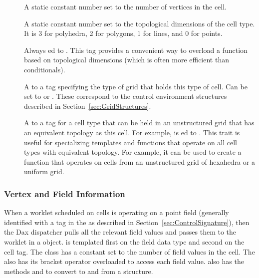 \begin{description}
\item[]  A static
  constant number set to the number of vertices in the cell.
\item[]
   A static constant number set to the
  topological dimensions of the cell type. It is 3 for polyhedra, 2 for
  polygons, 1 for lines, and 0 for points.
\item[] 
  Always ed to
  \textcode{<}\textcode{>}.
  This tag provides a convenient way to overload a function based on
  topological dimensions (which is often more efficient than conditionals).
\item[]  A  to a tag
  specifying the type of grid that holds this type of cell. Can be set to
   or . These correspond to
  the control environment structures described in
  Section~\ref{sec:GridStructures}.
\item[]  A
   to a tag for a cell type that can be held in an
  unstructured grid that has an equivalent topology as this cell. For
  example,
  \textcode{<}
  is ed to . This trait is useful
  for specializing templates and functions that operate on all cell types
  with equivalent topology. For example, it can be used to create a
  function that operates on cells from an unstructured grid of hexahedra or
  a uniform grid.
\end{description}

\subsubsection{Vertex and Field Information}


When a worklet scheduled on cells is operating on a point field (generally
identified with a  tag in the \controlsignature as
described in Section~\ref{sec:ControlSignature}), then the Dax dispatcher
pulls all the relevant field values and passes them to the worklet in a
 object.  is templated first
on the field data type and second on the cell tag. The
 class has a
 constant set to the
number of field values in the cell. The  also has
its bracket operator overloaded to access each field
value.  also has the methods
 and  to convert to and from a
 structure.

